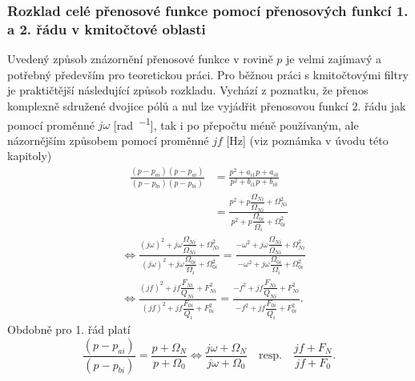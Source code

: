         \subsubsection{Rozklad celé přenosové funkce pomocí přenosových funkcí 1. a 2. řádu v
                       kmitočtové oblasti}
          
          Uvedený způsob znázornění přenosové funkce v rovině \(p\) je velmi zajímavý a potřebný
          především pro teoretickou práci. Pro běžnou práci s kmitočtovými filtry je praktičtější
          následující způsob rozkladu. Vychází z poznatku, že přenos komplexně sdružené dvojice pólů
          a nul lze vyjádřit přenosovou funkcí 2. řádu jak pomocí proměnné \(j\omega\)
          [\unit{\radian\per\sec}], tak i po přepočtu méně používaným, ale názornějším způsobem pomocí
          proměnné \(jf\) [\unit{\Hz}] (viz poznámka v úvodu této kapitoly) 
          \begin{align}\label{aes:eq033}
            \frac{(p-p_{ai})(p-p_{ai})}{(p-p_{bi})(p-p_{bi})}
              &= \frac{p^2 + a_{i1}p + a_{i0}}{p^2 + b_{i1}p + b_{i0}}          \nonumber \\ 
              &= \frac{p^2 + p\dfrac{\Omega_{Ni}}{\Omega_{Ni}} +\Omega^2_{Ni}}
                      {p^2 + p\dfrac{\Omega_{0i}}{\Omega_{i}} +\Omega^2_{0i}}        
          \end{align}
          \begin{align}\label{aes:eq040}   
            &\Leftrightarrow
             \frac{(j\omega)^2 + j\omega\dfrac{\Omega_{Ni}}{\Omega_{Ni}} +\Omega^2_{Ni}}
                  {(j\omega)^2 + j\omega\dfrac{\Omega_{0i}}{\Omega_{i}} +\Omega^2_{0i}}
            =\frac{-\omega^2   + j\omega\dfrac{\Omega_{Ni}}{\Omega_{Ni}} +\Omega^2_{Ni}}
                  {-\omega^2   + j\omega\dfrac{\Omega_{0i}}{\Omega_{i}} +\Omega^2_{0i}} \nonumber \\   
            &\Leftrightarrow
              \frac{(jf)^2 + jf\dfrac{F_{Ni}}{Q_{Ni}} + F^2_{Ni}}
                   {(jf)^2 + jf\dfrac{F_{0i}}{Q_{i}}  + F^2_{0i}}
            = \frac{-f^2   + jf\dfrac{F_{Ni}}{Q_{Ni}} + F^2_{Ni}}
                   {-f^2   + jf\dfrac{F_{0i}}{Q_{i}}  + F^2_{0i}}. 
          \end{align}
          Obdobně pro 1. řád platí
          \begin{equation}\label{aes:eq034}
            \frac{(p-p_{ai})}{(p-p_{bi})} = \frac{p + \Omega_N}{p + \Omega_0} \Leftrightarrow
            \frac{j\omega + \Omega_N}{j\omega + \Omega_0}\quad\text{resp.}\quad
            \frac{jf + F_N}{jf + F_0}.
          \end{equation}
                    
